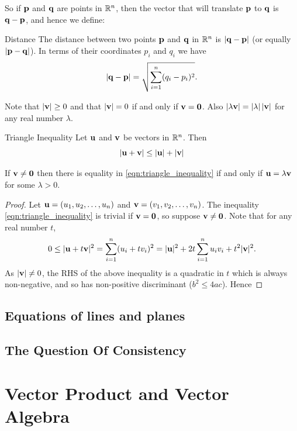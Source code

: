 So if $\vb{p}$ and $\vb{q}$ are points in $\mathbb R^n$, then the vector that will translate $\vb{p}$ to $\vb{q}$ is $\vb{q}-\vb{p}$, and hence we define:

\begin{defn}{Distance}{}
The distance between two points $\vb{p}$ and $\vb{q}$ in $\mathbb R^n$ is $|\vb{q}-\vb{p}|$ (or equally $|\vb{p}-\vb{q}|$). In terms of their coordinates $p_i$ and $q_i$ we have
\[ |\vb{q}-\vb{p}|=\sqrt{\sum_{i=1}^n(q_i-p_i)^2}. \]
\end{defn}

\begin{remark}
Note that $|\vb{v}|\ge0$ and that $|\vb{v}|=0$ if and only if $\vb{v}=\vb{0}$. Also $|\lambda\vb{v}|=|\lambda|\,|\vb{v}|$ for any real number $\lambda$.
\end{remark}

\begin{thrm}{Triangle Inequality}{}
Let $\vb{u}$ and $\vb{v}$ be vectors in $\mathbb R^n$. Then
\begin{equation}\label{eqn:triangle_inequality}
|\vb{u}+\vb{v}| \le |\vb{u}|+|\vb{v}|
\end{equation}
\end{thrm}

If $\vb{v}\neq\vb{0}$ then there is equality in \cref{eqn:triangle_inequality} if and only if $\vb{u}=\lambda\vb{v}$ for some $\lambda>0$.

\begin{proof}
Let $\vb{u}=(u_1,u_2,\dots,u_n)$ and $\vb{v}=(v_1,v_2,\dots,v_n)$. The inequality \cref{eqn:triangle_inequality} is trivial if $\vb{v}=\vb{0}$, so suppose $\vb{v}\neq\vb{0}$. Note that for any real number $t$,
\[ 0 \le |\vb{u}+t\vb{v}|^2 = \sum_{i=1}^n(u_i+tv_i)^2 = |\vb{u}|^2+2t\sum_{i=1}^nu_iv_i+t^2|\vb{v}|^2. \]
As $|\vb{v}|\neq0$, the RHS of the above inequality is a quadratic in $t$ which is always non-negative, and so has non-positive discriminant ($b^2\le4ac$). Hence
\end{proof}

\subsection{Equations of lines and planes}
\subsection{The Question Of Consistency}

\section{Vector Product and Vector Algebra}
